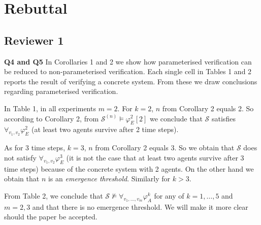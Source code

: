 \documentclass{article}
\begin{document}
\noindent{}

\section*{Rebuttal}
\subsection*{Reviewer 1}
\textbf{Q4 and Q5} In Corollaries 1 and 2 we show how parameterised
verification can be reduced to non-parameterised verification. Each
single cell in Tables 1 and 2 reports the result of verifying a
concrete system. From these we draw conclusions regarding
parameterised verification.

In Table 1, in all experiments $m=2$.
%
For $k=2$, $n$ from Corollary 2 equals 2. So according to Corollary 2,
from $\mathcal{S}^{(n)} \models \varphi^2_E[2]$ we conclude that
$\mathcal{S}$ satisfies $\forall_{v_1,v_2} \varphi^2_E$ (at least two
agents survive after 2 time steps).

As for 3 time steps, $k=3$, $n$ from Corollary 2 equals 3. So we
obtain that $\mathcal{S}$ does not satisfy
$\forall_{v_1,v_2} \varphi^3_E$ (it is not the case that at least two
agents survive after 3 time steps) because of the concrete system with
2 agents. On the other hand we obtain that $n$ is an \emph{emergence
  threshold}. Similarly for $k>3$.


From Table 2, we conclude that
$\mathcal{S}\not\models\forall_{v_1,\dots,v_m}\varphi^k_A$ for any of
$k=1,\dots,5$ and $m=2,3$ and that there is no emergence threshold. We
will make it more clear should the paper be accepted.
\end{document}
